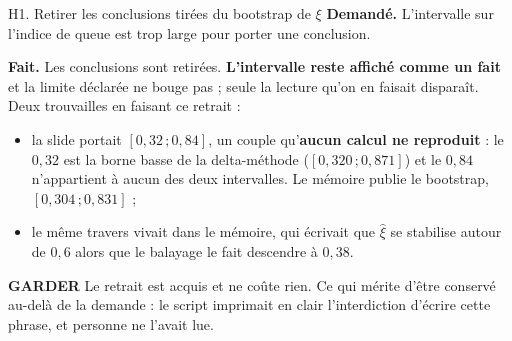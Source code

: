 \documentclass[11pt]{beamer}
\newcommand{\garder}{\textbf{GARDER}}
\newcommand{\srcs}[1]{\vspace{0.8mm}{\tiny\textcolor{gray!50!black}{Sources : #1}}}
\begin{document}
\begin{frame}{H1. Retirer les conclusions tirées du bootstrap de $\xi$}
\scriptsize
\textbf{Demandé.} L'intervalle sur l'indice de queue est trop large pour porter une conclusion.
\vspace{1mm}

\textbf{Fait.} Les conclusions sont retirées. \textbf{L'intervalle reste affiché comme un fait}
et la limite déclarée ne bouge pas ; seule la lecture qu'on en faisait disparaît. Deux
trouvailles en faisant ce retrait :
\begin{itemize}\itemsep1pt
\item la slide portait $[0{,}32\,;0{,}84]$, un couple qu'\textbf{aucun calcul ne reproduit} : le
$0{,}32$ est la borne basse de la delta-méthode ($[0{,}320\,;0{,}871]$) et le $0{,}84$
n'appartient à aucun des deux intervalles. Le mémoire publie le bootstrap,
$[0{,}304\,;0{,}831]$ ;
\item le même travers vivait dans le mémoire, qui écrivait que $\hat\xi$ \og se stabilise
autour de $0{,}6$ \fg{} alors que le balayage le fait descendre à $0{,}38$.
\end{itemize}
\begin{block}{\garder}
Le retrait est acquis et ne coûte rien. Ce qui mérite d'être conservé au-delà de la demande :
le script imprimait en clair l'interdiction d'écrire cette phrase, et personne ne l'avait lue.
\end{block}
\srcs{script~\texttt{47}}
\end{frame}
\end{document}
